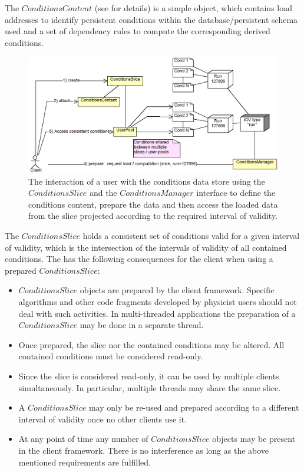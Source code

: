 \documentclass[10pt,a4paper]{article}
\begin{document}
\noindent
The $ConditionsContent$ 
(see  
for details)  is a simple object, which contains load addresses
to identify persistent conditions within the database/persistent schema 
used and a set of dependency rules to compute the corresponding derived conditions.

\begin{figure}[t]
  \begin{center}\includegraphics[width=15cm] {DDCond-ConditionsAccess}
    \caption{The interaction of a user with the conditions
             data store using the $ConditionsSlice$ and the 
             $ConditionsManager$ interface to define the conditions content, 
             prepare the data and then access the loaded data from the slice
             projected according to the required interval of validity.}
    \label{fig:ddcond-slice-usage}
  \end{center}
\end{figure}

\noindent
The $ConditionsSlice$ holds a consistent set of conditions valid for a given 
interval of validity, which is the intersection of the intervals of 
validity of all contained conditions. The has the following consequences 
for the client when using a prepared $ConditionsSlice$:
\begin{itemize}
\item $ConditionsSlice$ objects are prepared by the client framework.
      Specific algorithms and other code fragments developed by physicist users
      should not deal with such activities. In multi-threaded applications
      the preparation of a $ConditionsSlice$ may be done in a separate thread.
\item Once prepared, the slice nor the contained conditions may be altered.
      All contained conditions must be considered read-only.
\item Since the slice is considered read-only, it can be used by multiple 
      clients simultaneously. In particular, multiple threads may share 
      the same slice.
\item A $ConditionsSlice$ may only be re-used and prepared according to
      a different interval of validity once no other clients use it.
\item At any point of time any number of $ConditionsSlice$ objects
      may be present in the client framework. There is no interference
      as long as the above mentioned requirements are fulfilled.
\end{itemize}
\end{document}
